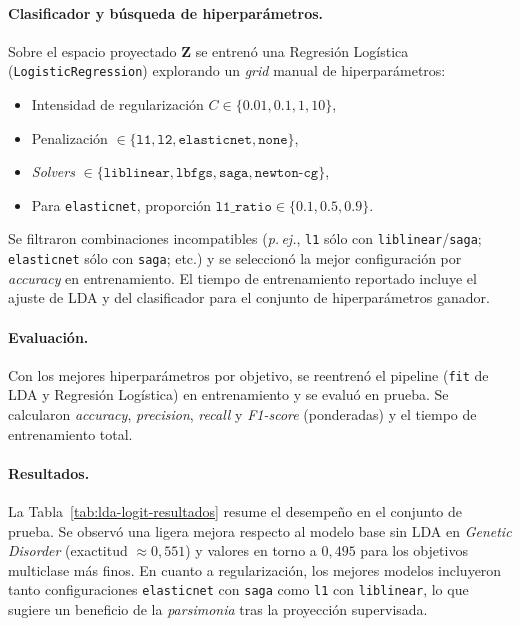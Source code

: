 \documentclass[11pt,a4paper,spanish]{book}
\numberwithin{equation}{chapter}
\numberwithin{figure}{chapter}
\begin{document}
\paragraph{Clasificador y búsqueda de hiperparámetros.}
Sobre el espacio proyectado $\mathbf{Z}$ se entrenó una Regresión Logística (\texttt{LogisticRegression}) explorando un \textit{grid} manual de hiperparámetros:
\begin{itemize}
    \item Intensidad de regularización $C \in \{0.01, 0.1, 1, 10\}$,
    \item Penalización $\in \{\texttt{l1}, \texttt{l2}, \texttt{elasticnet}, \texttt{none}\}$,
    \item \textit{Solvers} $\in \{\texttt{liblinear}, \texttt{lbfgs}, \texttt{saga}, \texttt{newton-cg}\}$,
    \item Para \texttt{elasticnet}, proporción $\texttt{l1\_ratio} \in \{0.1, 0.5, 0.9\}$.
\end{itemize}
Se filtraron combinaciones incompatibles (\emph{p.\,ej.}, \texttt{l1} sólo con \texttt{liblinear}/\texttt{saga}; \texttt{elasticnet} sólo con \texttt{saga}; etc.) y se seleccionó la mejor configuración por \textit{accuracy} en entrenamiento. El tiempo de entrenamiento reportado incluye el ajuste de LDA y del clasificador para el conjunto de hiperparámetros ganador.

\paragraph{Evaluación.}
Con los mejores hiperparámetros por objetivo, se reentrenó el pipeline (\texttt{fit} de LDA y Regresión Logística) en entrenamiento y se evaluó en prueba. Se calcularon \textit{accuracy}, \textit{precision}, \textit{recall} y \textit{F1-score} (ponderadas) y el tiempo de entrenamiento total.

\paragraph{Resultados.}
La Tabla~\ref{tab:lda-logit-resultados} resume el desempeño en el conjunto de prueba. Se observó una ligera mejora respecto al modelo base sin LDA en \textit{Genetic Disorder} (exactitud $\approx 0{,}551$) y valores en torno a $0{,}495$ para los objetivos multiclase más finos. En cuanto a regularización, los mejores modelos incluyeron tanto configuraciones \texttt{elasticnet} con \texttt{saga} como \texttt{l1} con \texttt{liblinear}, lo que sugiere un beneficio de la \emph{parsimonia} tras la proyección supervisada.
\end{document}
